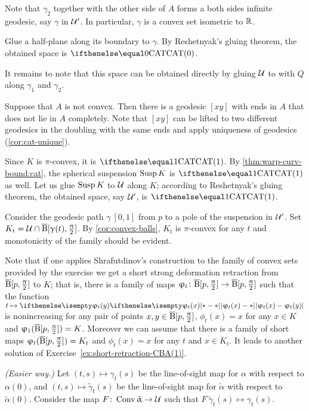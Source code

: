 Note that $\gamma_2$ together with the other side of $A$ forms a both sides infinite geodesic, say $\gamma$ in $\mathcal{U}'$.
In particular, $\gamma$ is a convex set isometric to $\mathbb{R}$.

Glue a half-plane along its boundary to $\gamma$.
By Reshetnyak's gluing theorem, the obtained space is $\CAT0$.

It remains to note that this space can be obtained directly by gluing $\mathcal{U}$ to with $Q$ along $\gamma_1$ and $\gamma_2$.

Suppose that $A$ is not convex.
Then there is a geodesic $[xy]$ with ends in $A$ that does not lie in $A$ completely.
Note that $[xy]$ can be lifted to two different geodesics in the doubling with the same ends and apply uniqueness of geodesics (\ref{cor:cat-unique}).

Since $K$ is $\pi$-convex, it is $\CAT1$.
By \ref{thm:warp-curv-bound:cat}, the spherical suspension $\mathop{\rm Susp}\nolimits K$ is $\CAT1$ as well.
Let us glue $\mathop{\rm Susp}\nolimits K$ to $\mathcal{U}$  along $K$;
according to Reshetnyak's gluing theorem, the obtained space, say $\mathcal{U}'$, is $\CAT1$.

Consider the geodesic path $\gamma\:[0,1]$ from $p$ to a pole of the suspension in $\mathcal{U}'$.
Set $K_t=\spc{U}\cap\cBall[\gamma(t),\tfrac\pi2]$.
By \ref{cor:convex-balls}, $K_t$ is $\pi$-convex for any $t$ and monotonicity of the family should be evident.

Note that if one applies Shrafutdinov's construction to the family of convex sets provided by the exercise we get a short strong deformation retraction from $\overline{\mathrm{B}}{}[p,\tfrac{\uppi}2]$ to $K$;
that is, there is a family of maps $\phi_t\:\cBall[p,\tfrac\pi2]\to \cBall[p,\tfrac\pi2]$ such that 
the function $t\mapsto \dist{\phi_t(x)}{\phi_t(y)}{}$ is nonincreasing for any pair of points $x,y\in\cBall[p,\tfrac\pi2]$, $\phi_t(x)=x$ for any $x\in K$ and $\upvarphi_1(\overline{\mathrm{B}}{}[p,\tfrac{\uppi}2])=K$. 
Moreover we can assume that there is a family of short maps $\upvarphi_t(\overline{\mathrm{B}}{}[p,\tfrac{\uppi}2])= K_t$ and $\phi_t(x)=x$ for any $t$ and $x\in K_t$.
It leads to another solution of Exercise~\ref{ex:short-retraction-CBA(1)}.




\textit{(Easier way.)} 
Let 
$(t,s)\mapsto \gamma_t(s)$ be the line-of-sight map 
for $\alpha$ with respect to $\alpha(0)$,
and 
$(t,s)\mapsto \tilde \gamma_t(s)$ be the line-of-sight map 
for $\tilde \alpha$ with respect to $\tilde \alpha(0)$.
Consider the map  $F\:\Conv\tilde \alpha\to \spc{U}$ such that 
$F\:\tilde \gamma_t(s)\mapsto \gamma_t(s)$.

